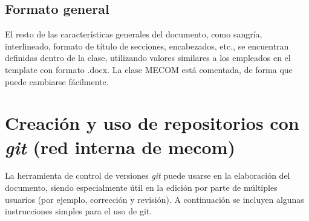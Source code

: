 \documentclass[a4paper,11pt,twoside]{MECOM}
\begin{document}
    
    
    \subsection{Formato general}
    El resto de las caracter\'isticas generales del documento, como sangr\'ia, interlineado, formato de t\'itulo de secciones, encabezados, etc., se encuentran definidas dentro de la clase, utilizando valores similares a los empleados en el template con formato .docx. La clase MECOM est\'a comentada, de forma que puede cambiarse f\'acilmente.
    
    
    
    
    \section{Creaci\'on y uso de repositorios con \emph{git} (red interna de mecom)}
    La herramienta de control de versiones \emph{git} puede usarse en la elaboraci\'on del documento, siendo especialmente \'util en la edici\'on por parte de m\'ultiples usuarios (por ejemplo, correcci\'on y revisi\'on). A continuaci\'on se incluyen algunas instrucciones simples para el uso de git.
    
\end{document}
